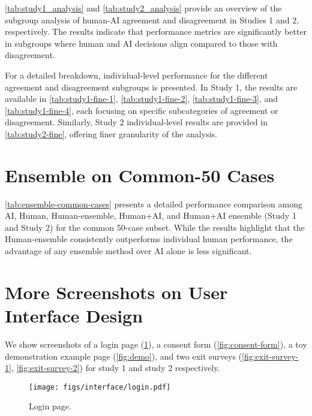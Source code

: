 \cref{tab:study1_analysis} and \cref{tab:study2_analysis} provide an overview of the subgroup analysis of human-AI agreement and disagreement in Studies 1 and 2, respectively. The results indicate that performance metrics are significantly better in subgroups where human and AI decisions align compared to those with disagreement.

For a detailed breakdown, individual-level performance for the different agreement and disagreement subgroups is presented. In Study 1, the results are available in \cref{tab:study1-fine-1}, \cref{tab:study1-fine-2}, \cref{tab:study1-fine-3}, and \cref{tab:study1-fine-4}, each focusing on specific subcategories of agreement or disagreement. Similarly, Study 2 individual-level results are provided in \cref{tab:study2-fine}, offering finer granularity of the analysis.





\section{Ensemble on Common-50 Cases}

\cref{tab:ensemble-common-cases} presents a detailed performance comparison among AI, Human, Human-ensemble, Human+AI, and Human+AI ensemble (Study 1 and Study 2) for the common 50-case subset. While the results highlight that the Human-ensemble consistently outperforms individual human performance, the advantage of any ensemble method over AI alone is less significant.






\section{More Screenshots on User Interface Design}
\label{sec:ui-design}

We show screenshots of a login page (\cref{fig:login}), a consent form (\cref{fig:consent-form}), a toy demonstration example page (\cref{fig:demo}), and two exit surveys (\cref{fig:exit-survey-1}, \cref{fig:exit-survey-2}) for study 1 and study 2 respectively.

 


\begin{figure}[ht]
    \centering
    \texttt{[image: figs/interface/login.pdf]}
    \caption{Login page.}
    \label{fig:login}
\end{figure}

